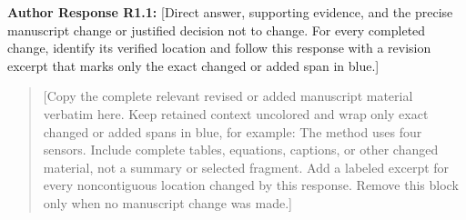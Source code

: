 \documentclass[journal,10pt,onecolumn,draftclsnofoot,a4paper]{IEEEtran}
\newcommand{\changed}[1]{{\color{blue}#1}}
\newenvironment{revisionexcerpt}{\begin{quote}}{\end{quote}}
\begin{document}
\textbf{Author Response R1.1:} [Direct answer, supporting evidence, and
the precise manuscript change or justified decision not to change. For every
completed change, identify its verified location and follow this response with
a revision excerpt that marks only the exact changed or added span in blue.]

\begin{revisionexcerpt}
[Copy the complete relevant revised or added manuscript material verbatim here.
Keep retained context uncolored and wrap only exact changed or added spans in
\changed{blue}, for example: The method uses \changed{four} sensors. Include
complete tables, equations, captions, or other changed material, not a summary
or selected fragment. Add a labeled excerpt for every noncontiguous location
changed by this response. Remove this block only when no manuscript change was
made.]
\end{revisionexcerpt}

\end{document}

